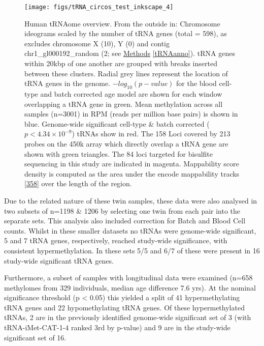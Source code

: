 \documentclass[
]{book}
\begin{document}
\begin{figure}

{\centering \texttt{[image: figs/tRNA\_circos\_test\_inkscape\_4]} 

}

\caption{Human tRNAome overview. From the outside in: Chromosome ideograms scaled by the number of tRNA genes (total = 598), as excludes chromosome X (10), Y (0) and contig chr1\_gl000192\_random (2; see \protect\hyperlink{tRNAanno}{Methods} \ref{tRNAanno}). tRNA genes within 20kbp of one another are grouped with breaks inserted between these clusters. Radial grey lines represent the location of tRNA genes in the genome. \(-log_{10}(p-value)\) for the blood cell-type and batch corrected age model are shown for each window overlapping a tRNA gene in green. Mean methylation across all samples (n=3001) in RPM (reads per million base pairs) is shown in blue. Genome-wide significant cell-type \& batch corrected (\(p < 4.34\times10^{-9}\)) tRNAs show in red. The 158 Loci covered by 213 probes on the 450k array which directly overlap a tRNA gene are shown with green triangles. The 84 loci targeted for bisulfite sequencing in this study are indicated in magenta. Mappability score density is computed as the area under the encode mappability tracks {[}\protect\hyperlink{ref-Derrien2012}{358}{]} over the length of the region.}\label{fig:circos}
\end{figure}



Due to the related nature of these twin samples, these data were also analysed in two subsets of n=1198 \& 1206 by selecting one twin from each pair into the separate sets.
This analysis also included correction for Batch and Blood Cell counts.
Whilst in these smaller datasets no tRNAs were genome-wide significant, 5 and 7 tRNA genes, respectively, reached study-wide significance, with consistent hypermethylation.
In these sets 5/5 and 6/7 of these were present in 16 study-wide significant tRNA genes.

Furthermore, a subset of samples with longitudinal data were examined (n=658 methylomes from 329 individuals, median age difference 7.6 yrs).
At the nominal significance threshold (p \textless{} 0.05) this yielded a split of 41 hypermethylating tRNA genes and 22 hypomethylating tRNA genes.
Of these hypermethylated tRNAs, 2 are in the previously identified genome-wide significant set of 3 (with tRNA-iMet-CAT-1-4 ranked 3rd by p-value) and 9 are in the study-wide significant set of 16.
\end{document}
